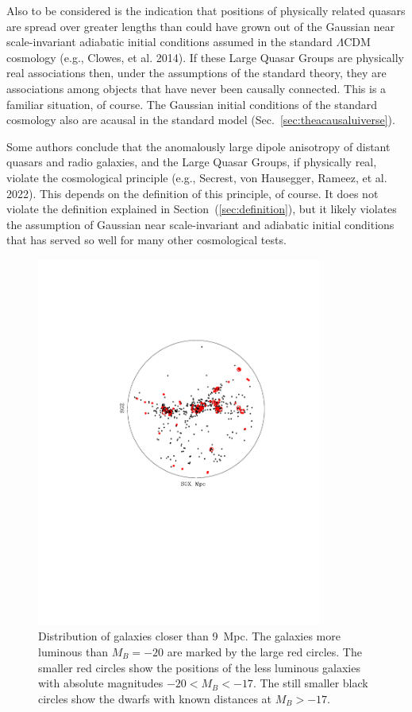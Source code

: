 \documentclass[fleqn,12pt]{article}
\begin{document}
Also to be considered is the indication that positions of physically related quasars are spread over greater lengths than could have grown out of the Gaussian near scale-invariant adiabatic initial conditions assumed in the standard $\Lambda$CDM cosmology (e.g., Clowes, et al. 2014). If these Large Quasar Groups are physically real associations then, under the assumptions of the standard theory, they are associations among objects that have never been causally connected. This is a familiar situation, of course. The Gaussian initial conditions of the standard cosmology also are acausal in the standard model (Sec.~\ref{sec:theacausaluiverse}). 

Some authors conclude that the anomalously large dipole anisotropy of distant quasars and radio galaxies, and the Large Quasar Groups, if physically real, violate the  cosmological principle (e.g., Secrest, von Hausegger, Rameez, et al. 2022). This depends on the definition of this principle, of course. It does not violate the definition explained in Section~(\ref{sec:definition}), but it likely violates the assumption of Gaussian near scale-invariant and adiabatic initial conditions that has served so well for many other cosmological tests. 

\begin{figure}
\begin{center}
\includegraphics[angle=0,width=3.7in]{LocalVol.pdf} 
\caption{Distribution of galaxies closer than 9~Mpc. The galaxies more luminous than $M_B = -20$ are marked by the large red circles. The smaller  red circles show the positions of the less luminous galaxies with absolute magnitudes $-20 < M_B < -17$. The still smaller black circles show the dwarfs with known distances at $M_B > -17$.}\label{fig:LocalVol}
\end{center}
\end{figure}
\end{document}
